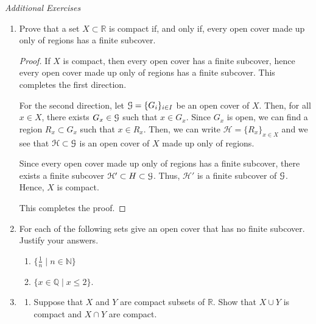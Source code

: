 \documentclass[11pt]{article}
\newcommand{\bbN}{\mathbb{N}}
\newcommand{\bbQ}{\mathbb{Q}}
\newcommand{\bbR}{\mathbb{R}}
\renewcommand{\_}[1]{\underline{ #1 }}
\theoremstyle{definition}
\numberwithin{equation}{subsection}
\begin{document}
\bigskip


\begin{center}
{\em Additional Exercises}
\end{center}



\begin{enumerate}




\item
Prove that a set $X\subset \bbR$ is compact if, and only if, every open cover made up only of regions has a finite subcover.


\begin{proof}
If $X$ is compact, then every open cover has a finite subcover, hence every open cover made up only of regions has a finite subcover. This completes the first direction.

For the second direction, let $\mathcal G=\{G_i\}_{i\in I}$ be an open cover of $X$. Then, for all $x \in X$, there exists $G_x \in \mathcal G$ such that $x \in G_x$. Since $G_x$ is open, we can find a region $R_x \subset G_x$ such that $x \in R_x$. Then, we can write $\mathcal{H}=\{R_x\}_{x\in X}$ and we see that $\mathcal{H} \subset \mathcal G$ is an open cover of $X$ made up only of regions. 

Since every open cover made up only of regions has a finite subcover, there exists a finite subcover $\mathcal{H'}\subset H \subset \mathcal G$. Thus, $\mathcal{H'}$ is a finite subcover of $\mathcal G$. Hence, $X$ is compact.

This completes the proof.

\renewcommand\qedsymbol{QED}
\end{proof}



\item



For each of the following sets  give an open cover that has no finite subcover. Justify your answers.

\begin{enumerate}
\item $\{\frac{1}{n}\mid n\in\bbN\}$


\item $\{x\in\bbQ\mid x\leq 2\}.$

\end{enumerate}






\item 
\begin{enumerate}
\item
	 Suppose that $X$ and $Y$ are compact subsets of $\bbR$.  Show that $X\cup Y$ is compact  and $X\cap Y$ are compact. 


\end{enumerate}
\end{enumerate}
\end{document}
